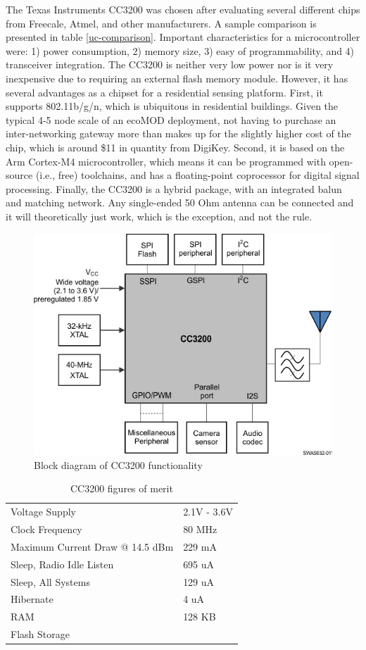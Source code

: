 The Texas Instruments CC3200 was chosen after evaluating several different chips from Freecale, Atmel, and other manufacturers. A sample comparison is presented in table \ref{uc-comparison}. Important characteristics for a microcontroller were: 1) power consumption, 2) memory size, 3) easy of programmability, and 4) transceiver integration. The CC3200 is neither very low power nor is it very inexpensive due to requiring an external flash memory module. However, it has several advantages as a chipset for a residential sensing platform. First, it supports 802.11b/g/n, which is ubiquitous in residential buildings. Given the typical 4-5 node scale of an ecoMOD deployment, not having to purchase an inter-networking gateway more than makes up for the slightly higher cost of the chip, which is around \$11 in quantity from DigiKey. Second, it is based on the Arm Cortex-M4 microcontroller, which means it can be programmed with open-source (i.e., free) toolchains, and has a floating-point coprocessor for digital signal processing. Finally, the CC3200 is a hybrid package, with an integrated balun and matching network. Any single-ended 50 Ohm antenna can be connected and it will theoretically just work, which is the exception, and not the rule.

\begin{figure}[h]
\centering
\includegraphics[width=0.5\linewidth]{images/cc3200-block}
\caption[CC3200 Block Diagram]{Block diagram of CC3200 functionality\cite{2015}}
\label{fig:cc3200-block}
\end{figure}

\begin{table}[h]
\caption{CC3200 figures of merit}
\label{CC3200-fom}
\begin{tabular}{@{}l|l@{}}
\toprule
Voltage Supply                  & 2.1V - 3.6V \\
Clock Frequency                 & 80 MHz      \\
Maximum Current Draw @ 14.5 dBm & 229 mA      \\
Sleep, Radio Idle Listen        & 695 uA      \\
Sleep, All Systems              & 129 uA      \\
Hibernate                       & 4 uA        \\
RAM                             & 128 KB      \\
Flash Storage                   &             \\ \bottomrule
\end{tabular}
\end{table}

